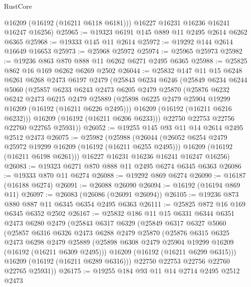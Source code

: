 \begin{lexlean}{RustCore}
\begin{coremodule}
        @16209
        (@16192 (@16211 @6118 @6181)))
      @16227
      @16231
      @16236
      @16241
      @16247
      @16256)
@25965 := @19323 @6191 @145 @889 @11 @2495 @2614 @6262 @6365
@25968 := @19333 @145 @11 @2614
@25972 := @19292 @144 @2614 @16649 @16653
@25973 := @25968 @25972
@25974 := @25965 @25973
@25982 := @19236 @863 @870 @888 @11 @6262 @6271 @2495 @6365
@25988 := @25825 @862 @16 @169 @6262 @6269 @2502
@26044 := @25832
    @147
    @11
    @15
    @6248
    @6261
    @6268
    @2473
    @6197
    @2479
    (@25843
      @6234
      @6246
      (@25849
        @6234
        @6244
        @5060
        (@25857
          @6233
          @6243
          @2473
          @6205
          @2479
          @25870
          (@25876
            @6232
            @6242
            @2473
            @6215
            @2479
            @25889
            (@25898 @6225 @2479 @25904 @19299 @16209 (@16192 (@16211 @6226 @2495)))
            @16209
            (@16192 (@16211 @6216 @6232)))
          @16209
          (@16192 (@16211 @6206 @6233)))
        @22750
        @22753
        @22756
        @22760
        @22765
        @25931))
@26052 := @19255 @145 @93 @11 @14 @2614 @2495 @2512 @2473
@26075 := @25982
    (@25988
      (@26044
        (@26052 @6254 @2479 @25972 @19299 @16209 (@16192 (@16211 @6255 @2495)))
        @16209
        (@16192 (@16211 @6198 @6261)))
      @16227
      @16231
      @16236
      @16241
      @16247
      @16256)
@26083 := @19323 @6271 @870 @888 @11 @2495 @6274 @6345 @6363
@26086 := @19333 @870 @11 @6274
@26088 := @19292 @869 @6274
@26090 := @16187 (@16188 @6274)
@26091 := @26088 @26090
@26094 := @16192 (@16194 @869 @11)
@26097 := @26083 (@26086 (@26091 @26094))
@26105 := @19236 @873 @880 @887 @11 @6345 @6354 @2495 @6363
@26111 := @25825 @872 @16 @169 @6345 @6352 @2502
@26167 := @25832
    @186
    @11
    @15
    @6331
    @6344
    @6351
    @2473
    @6280
    @2479
    (@25843
      @6317
      @6329
      (@25849
        @6317
        @6327
        @5060
        (@25857
          @6316
          @6326
          @2473
          @6288
          @2479
          @25870
          (@25876
            @6315
            @6325
            @2473
            @6298
            @2479
            @25889
            (@25898 @6308 @2479 @25904 @19299 @16209 (@16192 (@16211 @6309 @2495)))
            @16209
            (@16192 (@16211 @6299 @6315)))
          @16209
          (@16192 (@16211 @6289 @6316)))
        @22750
        @22753
        @22756
        @22760
        @22765
        @25931))
@26175 := @19255 @184 @93 @11 @14 @2714 @2495 @2512 @2473

\end{coremodule}
\end{lexlean}
